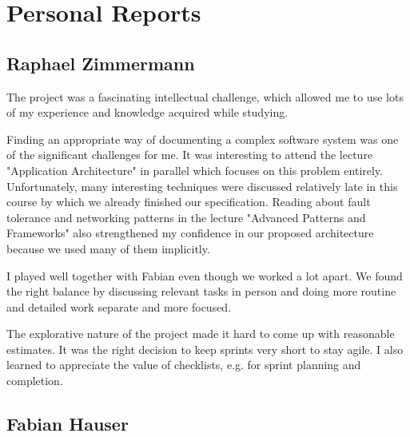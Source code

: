 \section{Personal Reports}

\subsection{Raphael Zimmermann}

The project was a fascinating intellectual challenge, which allowed me to use lots of my experience and knowledge acquired while studying.

Finding an appropriate way of documenting a complex software system was one of the significant challenges for me. It was interesting to attend the lecture "Application Architecture" in parallel which focuses on this problem entirely. Unfortunately, many interesting techniques were discussed relatively late in this course by which we already finished our specification. Reading about fault tolerance and networking patterns in the lecture "Advanced Patterns and Frameworks" also strengthened my confidence in our proposed architecture because we used many of them implicitly.

I played well together with Fabian even though we worked a lot apart. We found the right balance by discussing relevant tasks in person and doing more routine and detailed work separate and more focused.

The explorative nature of the project made it hard to come up with reasonable estimates. It was the right decision to keep sprints very short to stay agile. I also learned to appreciate the value of checklists, e.g. for sprint planning and completion.

\subsection{Fabian Hauser}